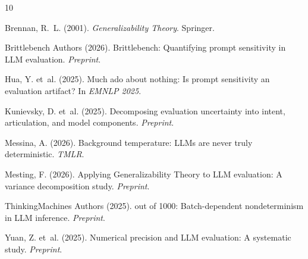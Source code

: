 \documentclass[letterpaper]{article}
\begin{document}
\begin{thebibliography}{10}

Brennan, R.~L. (2001).
\newblock \emph{Generalizability Theory}.
\newblock Springer.

Brittlebench Authors (2026).
\newblock Brittlebench: Quantifying prompt sensitivity in LLM evaluation.
\newblock \emph{Preprint}.

Hua, Y. et~al. (2025).
\newblock Much ado about nothing: Is prompt sensitivity an evaluation artifact?
\newblock In \emph{EMNLP 2025}.

Kunievsky, D. et~al. (2025).
\newblock Decomposing evaluation uncertainty into intent, articulation, and model components.
\newblock \emph{Preprint}.

Messina, A. (2026).
\newblock Background temperature: LLMs are never truly deterministic.
\newblock \emph{TMLR}.

Mesting, F. (2026).
\newblock Applying Generalizability Theory to LLM evaluation: A variance decomposition study.
\newblock \emph{Preprint}.

ThinkingMachines Authors (2025).
 out of 1000: Batch-dependent nondeterminism in LLM inference.
\newblock \emph{Preprint}.

Yuan, Z. et~al. (2025).
\newblock Numerical precision and LLM evaluation: A systematic study.
\newblock \emph{Preprint}.

\end{thebibliography}
\end{document}
